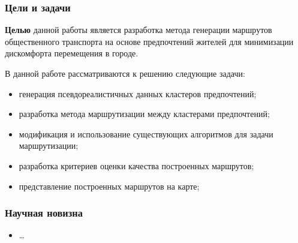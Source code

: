 \begin{frame}
    \frametitle{Цели и задачи}
    \textbf{Целью} данной работы является разработка метода генерации маршрутов общественного 
    транспорта на основе предпочтений жителей для минимизации дискомфорта перемещения в городе.

    В данной работе рассматриваются к решению следующие задачи:
    \begin{itemize}\itemsep-5pt
        \item генерация псевдореалистичных данных кластеров предпочтений;
        \item разработка метода маршрутизации между кластерами предпочтений;
        \item модификация и использование существующих алгоритмов для задачи маршрутизации;
        \item разработка критериев оценки качества построенных маршрутов;
        \item представление построенных маршрутов на карте;
    \end{itemize}
\end{frame}

\begin{frame}
    \frametitle{Научная новизна}
    \begin{itemize}\itemsep-5pt
        \item \ldots
    \end{itemize}
\end{frame}



